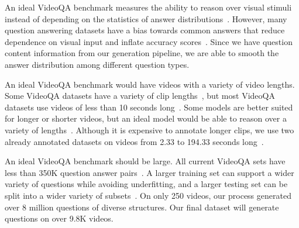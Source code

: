 \documentclass[10pt,twocolumn,letterpaper]{article}
\newcommand{\rak}[1]{{\color{red}{rak: #1}}}
\newcommand{\mgm}[1]{{\color{cyan}{mgm: #1}}}
\begin{document}
An ideal VideoQA benchmark measures the ability to reason over visual stimuli instead of depending on the statistics of answer distributions~\cite{vatashsky2020vqa}. However, many question answering datasets have a bias towards common answers that reduce dependence on visual input and inflate accuracy scores~\cite{goyal2017making, hudson2019gqa}. 
Since we have question content information from our generation pipeline, we are able to smooth the answer distribution among different question types. \mgm{ideally add in numbers about how that makes the blind model worse but idk}

An ideal VideoQA benchmark would have videos with a variety of video lengths. Some VideoQA datasets have a variety of clip lengths~\cite{yu2019activitynet,xu2017video}, but most VideoQA datasets use videos of less than 10 seconds long~\cite{jang2017tgif,kim2017deepstory,xu2017video,maharaj2017dataset,zeng2016leveraging,yu2019activitynet}. Some models are better suited for longer or shorter videos, but an ideal model would be able to reason over a variety of lengths~\cite{na2017read,le2020hierarchical}. Although it is expensive to annotate longer clips, we use two already annotated datasets on videos from 2.33 to 194.33 seconds long~\cite{sigurdsson2016hollywood,ji2020action}. \mgm{questionable how important this is, though it is true}

An ideal VideoQA benchmark should be large. All current VideoQA sets have less than 350K question answer pairs~\cite{jang2017tgif,kim2017deepstory,xu2017video,maharaj2017dataset,zeng2016leveraging,yu2019activitynet,lei2018tvqa,tapaswi2016movieqa}. A larger training set can support a wider variety of questions while avoiding underfitting, and a larger testing set can be split into a wider variety of subsets~\cite{maharaj2017dataset}. On only 250 videos, our process generated over 8 million questions of diverse structures. Our final dataset will generate questions on over 9.8K videos. \mgm{no longer as impressively large - probably take out}
\end{document}
